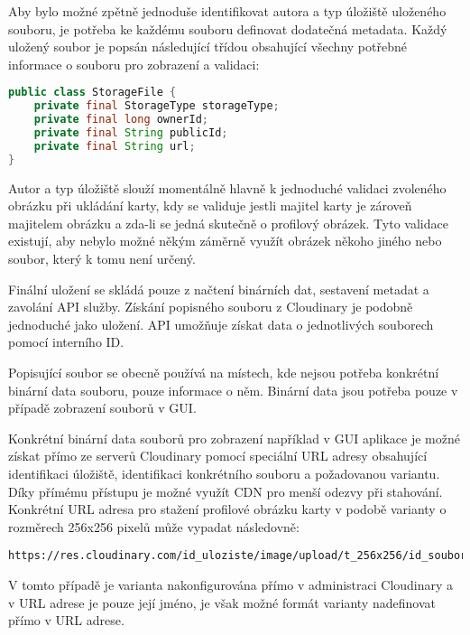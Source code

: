 		Aby bylo možné zpětně jednoduše identifikovat autora a typ úložiště uloženého souboru, je potřeba ke každému
		souboru definovat dodatečná metadata.
		Každý uložený soubor je popsán následující třídou obsahující všechny potřebné informace o souboru pro zobrazení
		a validaci:

		\begin{lstlisting}[language=Java, caption={Třída popisující uložený soubor v Cloudinary uložišti. Zdroj: [autor]}]
public class StorageFile {
    private final StorageType storageType;
    private final long ownerId;
    private final String publicId;
    private final String url;
}
		\end{lstlisting}

		Autor a typ úložiště slouží momentálně hlavně k jednoduché validaci zvoleného obrázku při ukládání karty, kdy
		se validuje jestli majitel karty je zároveň majitelem obrázku a zda-li se jedná skutečně o profilový obrázek.
		Tyto validace existují, aby nebylo možné někým záměrně využít obrázek někoho jiného nebo soubor, který k tomu
		není určený.

		Finální uložení se skládá pouze z načtení binárních dat, sestavení metadat a zavolání \ac{API}
		služby.
		Získání popisného souboru z Cloudinary je podobně jednoduché jako uložení.
		\ac{API} umožňuje získat data o jednotlivých souborech pomocí interního ID.

		Popisující soubor se obecně používá na místech, kde nejsou potřeba konkrétní binární data souboru, pouze
		informace o něm.
		Binární data jsou potřeba pouze v případě zobrazení souborů v \ac{GUI}.

		Konkrétní binární data souborů pro zobrazení například v \ac{GUI} aplikace je možné získat přímo ze serverů
		Cloudinary pomocí speciální \ac{URL} adresy obsahující identifikaci úložiště, identifikaci konkrétního souboru a
		požadovanou variantu.
		Díky přímému přístupu je možné využít \ac{CDN} pro menší odezvy při stahování.
		Konkrétní \ac{URL} adresa pro stažení profilové obrázku karty v podobě varianty o rozměrech 256x256 pixelů může
		vypadat následovně:

		\begin{lstlisting}[caption={Ukázka URL adresy souboru v Cloudinary uložišti. Zdroj: [autor]}]
https://res.cloudinary.com/id_uloziste/image/upload/t_256x256/id_souboru
		\end{lstlisting}

		V tomto případě je varianta nakonfigurována přímo v administraci Cloudinary a v \ac{URL} adrese je pouze její jméno,
		je však možné formát varianty nadefinovat přímo v \ac{URL} adrese.

